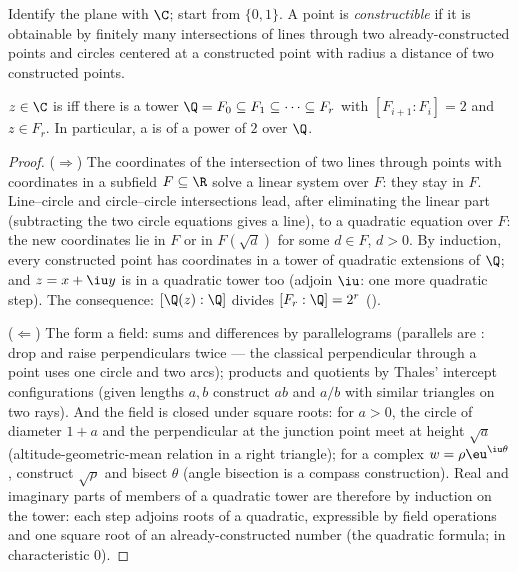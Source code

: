 \begin{definition}\label{def:b3:galois:constructible}
Identify the plane with $\C$; start from $\{0, 1\}$. A point is
\emph{constructible} if it is
obtainable by finitely many intersections of lines through two
already-constructed points and circles centered at a constructed
point with radius a distance of two constructed points.
\end{definition}

\begin{theorem}[Wantzel]\label{thm:b3:galois:wantzel}
$z \in \C$ is  iff there is a tower $\Q = F_0
\subseteq F_1 \subseteq \dots \subseteq F_r$ with $[F_{i+1} :
F_i] = 2$ and $z \in F_r$. In particular, a 
is  of  a power of $2$ over
$\Q$.
\end{theorem}

\begin{proof}
($\Rightarrow$) The coordinates of the intersection of two lines
through points with coordinates in a subfield $F \subseteq \R$
solve a linear system over $F$: they stay in $F$. Line--circle
and circle--circle intersections lead, after eliminating the
linear part (subtracting the two circle equations gives a line),
to a quadratic equation over $F$: the new coordinates lie in $F$
or in $F(\sqrt d)$ for some $d \in F$, $d > 0$. By induction,
every constructed point has coordinates in a tower of quadratic
extensions of $\Q$; and $z = x + \iu y$ is in a quadratic tower
too (adjoin $\iu$: one more quadratic step). The 
consequence: $[\Q(z):\Q]$ divides $[F_r : \Q] = 2^r$ ().

($\Leftarrow$) The  form a field: sums and
differences by parallelograms (parallels are :
drop and raise perpendiculars twice --- the classical
perpendicular through a point uses one circle and two arcs);
products and quotients by Thales' intercept configurations
(given lengths $a, b$ construct $ab$ and $a/b$ with similar
triangles on two rays). And the field is closed under square
roots: for $a > 0$, the circle of diameter $1 + a$ and the
perpendicular at the junction point meet at height $\sqrt a$
(altitude-geometric-mean relation in a right triangle); for a
complex $w = \rho\eu^{\iu\theta}$, construct $\sqrt\rho$ and
bisect $\theta$ (angle bisection is a compass construction).
Real and imaginary parts of members of a quadratic tower are
therefore  by induction on the tower: each step
adjoins roots of a quadratic, expressible by field operations
and one square root of an already-constructed number (the
quadratic formula; in characteristic $0$).
\end{proof}

